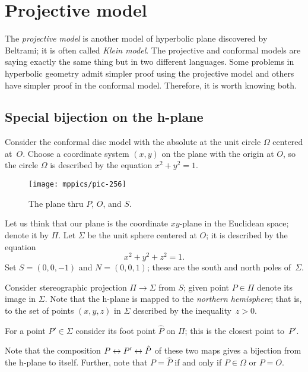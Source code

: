 \chapter{Projective model}\label{chap:klein}

The {}\emph{projective model} is another model of hyperbolic plane discovered by Beltrami; it is often called {}\emph{Klein model}.
The projective and conformal models are saying exactly the same thing but in two different languages. 
Some problems in hyperbolic geometry admit simpler proof using the projective model and others have simpler proof in the conformal model.
Therefore, it is worth knowing both. 

\section*{Special bijection on the h-plane}

Consider the conformal disc model with the absolute at the unit circle $\Omega$ centered at~$O$.
Choose a coordinate system $(x,y)$ on the plane with the origin at $O$, 
so the circle $\Omega$ is described by the equation $x^2+y^2=1$.

{

\label{pic:stereographic_projection-klein}
\begin{wrapfigure}[17]{o}{48mm}
\centering
\texttt{[image: mppics/pic-256]}
\caption*{The plane thru $P$, $O$, and $S$.}
\end{wrapfigure}

Let us think that our plane is the coordinate $xy$-plane in the Euclidean space; denote it by $\Pi$.
Let $\Sigma$ be the unit sphere centered at $O$;
it is described by the equation 
$$x^2+y^2+z^2=1.$$
Set $S=(0,0,-1)$ and $N=(0,0,1)$; 
these are the south and north poles of~$\Sigma$.

Consider stereographic projection $\Pi\to\Sigma$ from $S$;
given point $P\in\Pi$ denote its image in $\Sigma$.
Note that the  h-plane is mapped to the {}\emph{northern hemisphere};
that is, to the set of points $(x,y,z)$ in $\Sigma$ described by the inequality~$z>0$.

}

For a point $P'\in \Sigma$ consider its foot point $\hat P$
on $\Pi$;
this is the closest point to~$P'$.

Note that the composition $P\z\leftrightarrow P'\z\leftrightarrow\hat P$ of these two maps
gives a bijection from the h-plane to itself.
Further, note that $P=\hat P$
 if and only if  $P\in \Omega$ or $P=O$.

